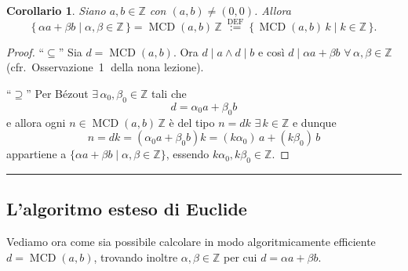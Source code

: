 \documentclass[11pt,a4paper]{article}
\newcommand{\Z}{\mathbb{Z}}
\theoremstyle{definition}
\theoremstyle{plain}
\newtheorem{corollario}[definizione]{Corollario}
\theoremstyle{remark}
\begin{document}
\begin{corollario}
Siano $a,b\in\Z$ con $(a,b)\neq(0,0)$. Allora
\[
\{\,\alpha a+\beta b\mid\alpha,\beta\in\Z\,\}=\operatorname{MCD}(a,b)\,\Z\ \overset{\text{DEF}}{:=}\ \{\,\operatorname{MCD}(a,b)\,k\mid k\in\Z\,\}.
\]
\end{corollario}

\begin{proof}
``$\subseteq$'' Sia $d=\operatorname{MCD}(a,b)$. Ora $d\mid a\wedge d\mid b$ e così $d\mid\alpha a+\beta b$ $\forall\,\alpha,\beta\in\Z$ (cfr.\ Osservazione~\textcircled{\small1} della nona lezione).

``$\supseteq$'' Per Bézout $\exists\,\alpha_0,\beta_0\in\Z$ tali che
\[
d=\alpha_0a+\beta_0b
\]
e allora ogni $n\in\operatorname{MCD}(a,b)\,\Z$ è del tipo $n=dk$ $\exists\,k\in\Z$ e dunque
\[
n=dk=(\alpha_0a+\beta_0b)k=(k\alpha_0)\,a+(k\beta_0)\,b
\]
appartiene a $\{\alpha a+\beta b\mid\alpha,\beta\in\Z\}$, essendo $k\alpha_0,k\beta_0\in\Z$. \qedhere
\end{proof}

\bigskip\hrule\bigskip

\subsection{L'algoritmo esteso di Euclide}

Vediamo ora come sia possibile calcolare in modo algoritmicamente efficiente $d=\operatorname{MCD}(a,b)$, trovando inoltre $\alpha,\beta\in\Z$ per cui $d=\alpha a+\beta b$.
\end{document}
